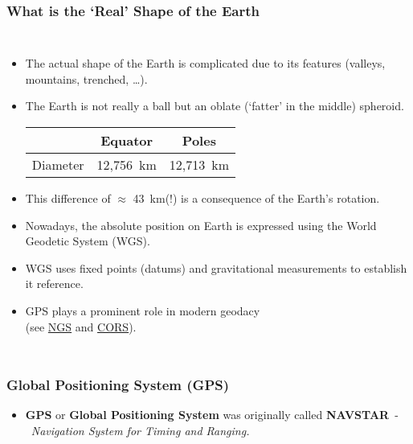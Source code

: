 \begin{frame}
\frametitle{What is the `Real' Shape of the Earth} 
\begin{columns}
	\begin{itemize}
		\item The actual shape of the Earth is complicated due to its features (valleys, mountains, trenched, \ldots).
		\item The Earth is not really a ball but an oblate (`fatter' in the middle) spheroid.
		
		\begin{center}
			\begin{tabular}{ccc}
				& Equator & Poles\\
				\toprule
				Diameter & 12,756~km & 12,713~km \\
			\end{tabular}
		\end{center}
		
		\item This difference of $\approx$ 43~km(!) is a consequence of the Earth's rotation.
		\item Nowadays, the absolute position on Earth is expressed using the World Geodetic System (WGS).
		\item WGS uses fixed points (datums) and gravitational measurements to establish it reference.
		\item GPS plays a prominent role in modern geodacy\\ (see \href{http://www.ngs.noaa.gov}{NGS} and \href{http://geodesy.noaa.gov/CORS/}{CORS}).
	\end{itemize}
\end{columns}
\end{frame}

\begin{frame}
\frametitle{Global Positioning System (GPS)}
\bigskip 
{}
\begin{itemize}
\item \textbf{GPS} or \textbf{Global Positioning System} was originally called \textbf{NAVSTAR}~-~\emph{Navigation System for Timing and Ranging.}
\end{itemize}
\end{frame}

